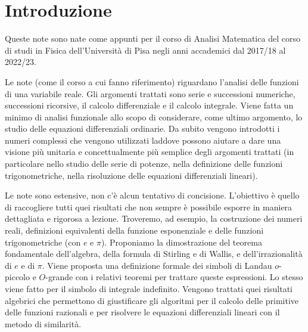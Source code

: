 \chapter*{Introduzione}


Queste note sono nate come appunti per il corso di Analisi Matematica %
del corso di studi in Fisica dell'Università %
di Pisa negli anni accademici dal 2017/18 al 2022/23. %

Le note (come il corso a cui fanno riferimento) %
riguardano l'analisi delle funzioni di una variabile %
reale. %
Gli argomenti trattati sono serie e successioni numeriche, %
successioni ricorsive, %
il calcolo differenziale e il calcolo integrale. %
Viene fatta un minimo di analisi funzionale allo scopo di considerare, %
come ultimo argomento, lo studio delle equazioni differenziali ordinarie. %
Da subito vengono introdotti i numeri complessi che vengono utilizzati %
laddove possono aiutare a dare una visione più unitaria e concettualmente %
più semplice degli argomenti trattati (in particolare nello studio delle serie %
di potenze, nella definizione delle funzioni trigonometriche, nella risoluzione delle equazioni differenziali lineari). %

Le note sono estensive, non c'è alcun tentativo di concisione. %
L'obiettivo è quello di raccogliere tutti quei risultati che non sempre è %
possibile esporre in maniera dettagliata e rigorosa a lezione. %
Troveremo, ad esempio, %
la costruzione dei numeri reali,
definizioni equivalenti della funzione esponenziale e %
delle funzioni trigonometriche (con $e$ e $\pi$). %
Proponiamo la dimostrazione del teorema fondamentale dell'algebra, %
della formula di Stirling e di Wallis, %
e dell'irrazionalità di $e$ e di $\pi$. %
Viene proposta una definizione formale dei simboli di Landau %
$o$-piccolo e $O$-grande con i relativi teoremi per trattare queste espressioni. %
Lo stesso viene fatto per il simbolo di integrale indefinito. %
Vengono trattati quei risultati algebrici che permettono di %
giustificare gli algoritmi per il calcolo delle primitive %
delle funzioni razionali e per risolvere le equazioni differenziali %
lineari con il metodo di similarità. %

